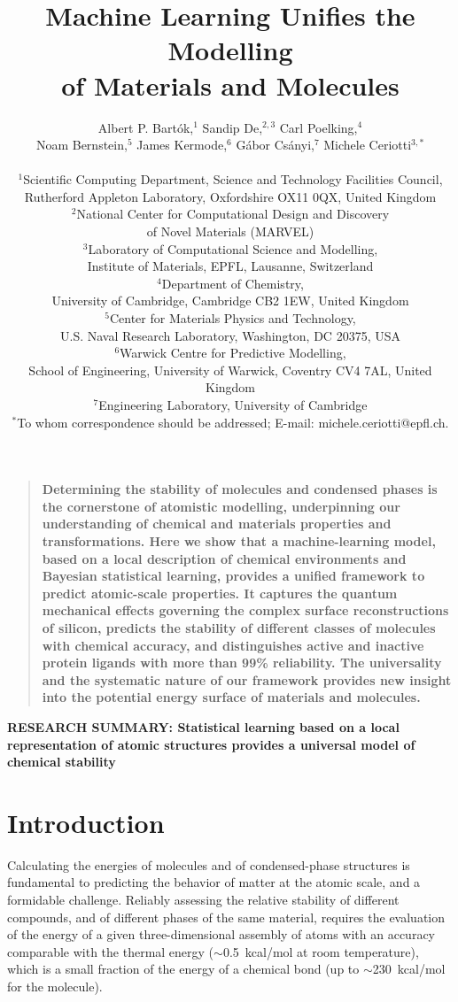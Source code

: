 \documentclass[12pt]{article}
\title{Machine Learning Unifies the 
Modelling \\of Materials and Molecules}
\author{Albert P. Bart\'ok,$^{1}$ 
Sandip De,$^{2,3}$ 
Carl Poelking,$^{4}$\\
Noam Bernstein,$^{5}$
James Kermode,$^{6}$
G{\'a}bor Cs{\'a}nyi,$^{7}$
Michele Ceriotti$^{3,\ast}$\\
\\
\normalsize{$^{1}$Scientific Computing Department, Science and Technology Facilities Council,}\\\normalsize{ Rutherford Appleton Laboratory,} \normalsize{Oxfordshire OX11 0QX, United Kingdom}\\
\normalsize{$^{2}$National Center
for Computational Design and Discovery}\\\normalsize{of Novel Materials (MARVEL)}\\
\normalsize{$^{3}$Laboratory of Computational Science and Modelling,}\\\normalsize{Institute of Materials, EPFL, Lausanne, Switzerland}\\
\normalsize{$^{4}$Department of Chemistry,}\\\normalsize{University of Cambridge, Cambridge CB2 1EW, United Kingdom}\\
\normalsize{$^{5}$Center for Materials Physics and Technology,}\\\normalsize{ U.S. Naval Research Laboratory, Washington, DC 20375, USA}\\
\normalsize{$^{6}$Warwick Centre for Predictive Modelling,}\\\normalsize{ School of Engineering, University of Warwick, Coventry CV4 7AL, United Kingdom}\\
\normalsize{$^{7}$Engineering Laboratory, University of Cambridge}
\\
\normalsize{$^\ast$To whom correspondence should be addressed; E-mail:  michele.ceriotti@epfl.ch.}
}
\date{}
\newenvironment{sciabstract}{%
\begin{quote} \bf}
{\end{quote}}
\begin{document}
 

%

\baselineskip24pt

%

\maketitle 
%
\newpage
\begin{sciabstract}
Determining the stability of molecules and condensed phases is the cornerstone of
atomistic modelling, underpinning our understanding of chemical and materials
properties and transformations.
Here we show that a machine-learning model, 
based on a local description of chemical environments and Bayesian statistical 
learning, provides a unified framework to predict atomic-scale properties.
It captures the quantum mechanical effects governing the complex 
surface reconstructions of silicon, predicts the stability of
different classes of molecules with chemical accuracy, 
and distinguishes active and inactive protein ligands with more than 99\% reliability.  The universality and the
systematic nature of our framework provides new insight into the potential 
energy surface of materials and molecules.
\end{sciabstract}

%
{\bf\noindent RESEARCH SUMMARY: Statistical learning based on a local representation of atomic
structures provides a universal model of chemical stability}


\section{Introduction}

Calculating the energies of molecules and of condensed-phase structures is fundamental to predicting the behavior of 
matter at the atomic scale, and a formidable challenge. Reliably assessing the relative stability
of different compounds, and of different phases of the same material, 
requires the evaluation of the energy of a given three-dimensional assembly of
atoms with an accuracy comparable with the thermal energy ($\sim$0.5~kcal/mol at 
room temperature), which is a small fraction of the energy of a chemical bond (up to $\sim$230~kcal/mol for the  molecule). 
\end{document}
